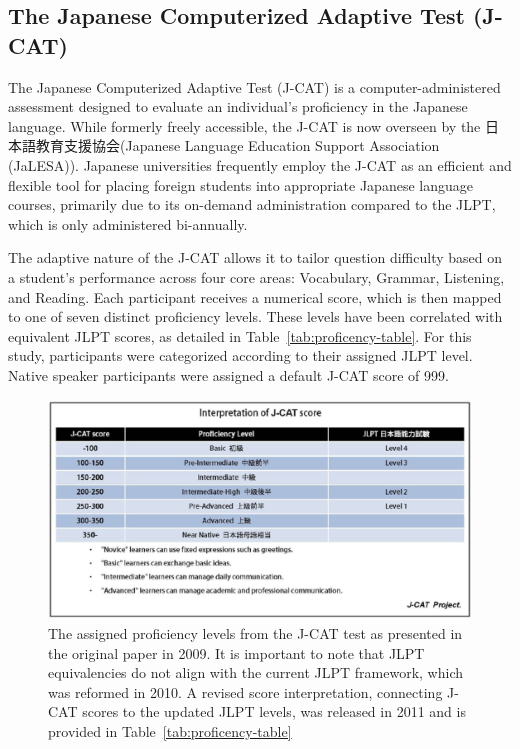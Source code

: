 \subsection{The Japanese Computerized Adaptive Test (J-CAT)}
\label{j-cat}


The Japanese Computerized Adaptive Test (J-CAT) \citep{Imai2009} is a computer-administered assessment
designed to evaluate an
individual's proficiency in the Japanese language. While formerly freely accessible, the J-CAT is now overseen by
the  日本語教育支援協会(Japanese Language Education Support Association (JaLESA)). Japanese
universities frequently
employ the J-CAT as an efficient and flexible tool for placing foreign students into appropriate Japanese
language courses, primarily due to its on-demand administration compared to the JLPT, which is only
administered bi-annually.

The adaptive nature of the J-CAT allows it to tailor question difficulty based on a student's performance across
four core areas: Vocabulary, Grammar, Listening, and Reading. Each participant receives a numerical score, which is
then mapped to one of seven distinct proficiency levels. These levels have been correlated with equivalent JLPT
scores, as detailed in Table~\ref{tab:proficency-table}. For this study, participants were categorized according to
their
assigned JLPT level. Native speaker participants were assigned a default J-CAT score of 999.

\begin{figure}[h!]
    \centering
    \includegraphics[scale=.3]{img/JCatScores.png}
    \caption[J-CAT Score Interpretation]{The assigned proficiency levels from the J-CAT test as presented in the original paper in  2009. It is
    important to note that JLPT equivalencies do not align with the current JLPT framework, which was reformed in 2010. A revised score interpretation, connecting J-CAT scores to the updated JLPT levels, was released in 2011 and is provided in Table~\ref{tab:proficency-table} }
    \label{fig:JCatLevels}
\end{figure}


